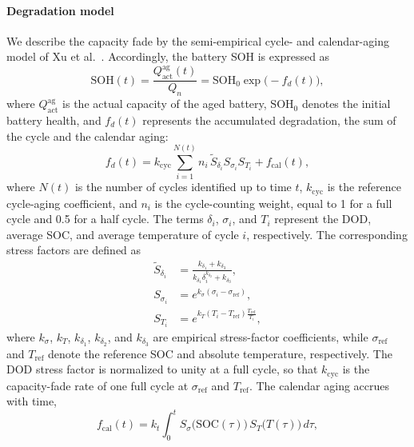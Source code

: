 \paragraph{Degradation model}
We describe the capacity fade by the semi-empirical cycle- and calendar-aging model of
Xu et al.~\cite{xu2016modeling}. Accordingly, the battery \ac{SOH} is expressed as
\begin{equation}
  \mathrm{SOH}(t) = \frac{Q^{\mathrm{ag}}_{\mathrm{act}}(t)}{Q_n}
  = \mathrm{SOH}_0 \exp\!\big(-f_d(t)\big),
  \label{eq:battery_soh_define}
\end{equation}
where $Q^{\mathrm{ag}}_{\mathrm{act}}$ is the actual capacity of the aged battery, $\mathrm{SOH}_0$
denotes the initial battery health, and $f_d(t)$ represents the accumulated degradation, the sum of
the cycle and the calendar aging:
\begin{equation}
  f_d(t) = k_{\mathrm{cyc}} \sum_{i=1}^{N(t)} n_i\, \widetilde{S}_{\delta_i} S_{\sigma_i} S_{T_i}
         + f_{\mathrm{cal}}(t),
  \label{eq:battery_fd}
\end{equation}
where $N(t)$ is the number of cycles identified up to time $t$, $k_{\mathrm{cyc}}$ is the reference
cycle-aging coefficient, and $n_i$ is the cycle-counting weight, equal to 1 for a full cycle and
0.5 for a half cycle. The terms $\delta_i$, $\sigma_i$, and $T_i$ represent the \ac{DOD}, average
\ac{SOC}, and average temperature of cycle $i$, respectively. The corresponding stress factors are
defined as
\begin{subequations}\label{eq:battery_soh_factor}
\begin{align}
  \widetilde{S}_{\delta_i} &= \frac{k_{\delta_1} + k_{\delta_3}}{k_{\delta_1}\delta_i^{k_{\delta_2}} + k_{\delta_3}}, \\
  S_{\sigma_i} &= e^{k_\sigma(\sigma_i - \sigma_{\mathrm{ref}})}, \\
  S_{T_i} &= e^{k_T (T_i - T_{\mathrm{ref}}) \frac{T_{\mathrm{ref}}}{T_i}},
\end{align}
\end{subequations}
where $k_\sigma$, $k_T$, $k_{\delta_1}$, $k_{\delta_2}$, and $k_{\delta_3}$ are empirical stress-factor
coefficients, while $\sigma_{\mathrm{ref}}$ and $T_{\mathrm{ref}}$ denote the reference \ac{SOC} and
absolute temperature, respectively. The \ac{DOD} stress factor is normalized to unity at a full
cycle, so that $k_{\mathrm{cyc}}$ is the capacity-fade rate of one full cycle at
$\sigma_{\mathrm{ref}}$ and $T_{\mathrm{ref}}$.
The calendar aging accrues with time,
\begin{equation}
  f_{\mathrm{cal}}(t) = k_t \int_0^{t} S_\sigma\big(\mathrm{SOC}(\tau)\big)\, S_T\big(T(\tau)\big)\, d\tau,
  \label{eq:xu_cal}
\end{equation}
